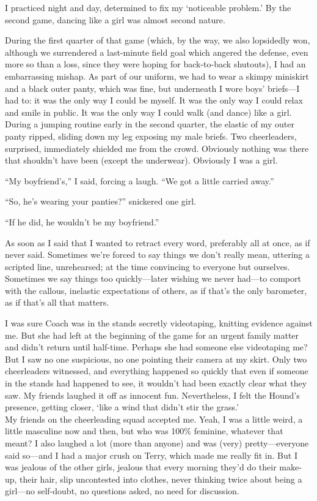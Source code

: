 I practiced night and day, determined to fix my `noticeable problem.' By
the second game, dancing like a girl was almost second nature.

During the first quarter of that game (which, by the way, we also
lopsidedly won, although we surrendered a last-minute field goal which
angered the defense, even more so than a loss, since they were hoping
for back-to-back shutouts), I had an embarrassing mishap. As part of our
uniform, we had to wear a skimpy miniskirt and a black outer panty,
which was fine, but underneath I wore boys' briefs---I had to: it was
the only way I could be myself. It was the only way I could relax and
smile in public. It was the only way I could walk (and dance) like a
girl. During a jumping routine early in the second quarter, the elastic
of my outer panty ripped, sliding down my leg exposing my male briefs.
Two cheerleaders, surprised, immediately shielded me from the crowd.
Obviously nothing was there that shouldn't have been (except the
underwear). Obviously I was a girl.

``My boyfriend's,'' I said, forcing a laugh. ``We got a little carried
away.''

``So, he's wearing your panties?'' snickered one girl.

``If he did, he wouldn't be my boyfriend.''

As soon as I said that I wanted to retract every word, preferably all at
once, as if never said. Sometimes we're forced to say things we don't
really mean, uttering a scripted line, unrehearsed; at the time
convincing to everyone but ourselves. Sometimes we say things too
quickly---later wishing we never had---to comport with the callous,
inelastic expectations of others, as if that's the only barometer, as if
that's all that matters.

I was sure Coach was in the stands secretly videotaping, knitting
evidence against me. But she had left at the beginning of the game for
an urgent family matter and didn't return until half-time. Perhaps she
had someone else videotaping me? But I saw no one suspicious, no one
pointing their camera at my skirt. Only two cheerleaders witnessed, and
everything happened so quickly that even if someone in the stands had
happened to see, it wouldn't had been exactly clear what they saw. My
friends laughed it off as innocent fun. Nevertheless, I felt the Hound's
presence, getting closer, `like a wind that didn't stir the grass.'\\

My friends on the cheerleading squad accepted me. Yeah, I was a little
weird, a little masculine now and then, but who was 100\% feminine,
whatever that meant? I also laughed a lot (more than anyone) and was
(very) pretty---everyone said so---and I had a major crush on Terry,
which made me really fit in. But I was jealous of the other girls,
jealous that every morning they'd do their make-up, their hair, slip
uncontested into clothes, never thinking twice about being a girl---no
self-doubt, no questions asked, no need for discussion.

